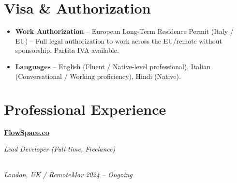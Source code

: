 \documentclass[a4paper,10pt]{article}
\newcommand{\role}[4]{\vspace{2pt}\noindent\hspace{0.6em}\parbox[t]{0.38\textwidth}{\raggedright\textbf{#1}}\hfill\parbox[t]{0.58\textwidth}{\raggedleft\textit{#2}}\\{\textit{#3}\hfill\textit{#4}}\vspace{1pt}}
\begin{document}
\section{Visa \& Authorization}
\begin{itemize}
\item \textbf{Work Authorization} -- European Long-Term Residence Permit (Italy / EU) -- Full legal authorization to work across the EU/remote without sponsorship. Partita IVA available.
\item \textbf{Languages} -- English (Fluent / Native-level professional), Italian (Conversational / Working proficiency), Hindi (Native).
\end{itemize}

\section{Professional Experience}
\role{\href{https://flowspace.co}{FlowSpace.co}}{Lead Developer (Full time, Freelance)}{London, UK / Remote}{Mar 2024 -- Ongoing}
\end{document}
